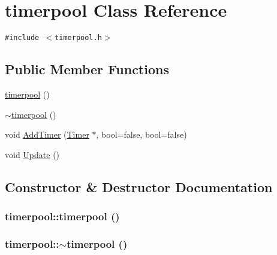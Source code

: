 \hypertarget{classtimerpool}{
\section{timerpool Class Reference}
\label{classtimerpool}
}
{\tt \#include $<$timerpool.h$>$}

\subsection*{Public Member Functions}
\begin{CompactItemize}
\item 
\hyperlink{classtimerpool_d7e24e59b3e1593632c0ce4151f52e1c}{timerpool} ()
\item 
\hyperlink{classtimerpool_de9e292e2815e887f289025956ec3268}{$\sim$timerpool} ()
\item 
void \hyperlink{classtimerpool_c3c343baa7b4c5f8786a542b402b3457}{AddTimer} (\hyperlink{class_timer}{Timer} $\ast$, bool=false, bool=false)
\item 
void \hyperlink{classtimerpool_550b453873442d702dfeb387297d2d82}{Update} ()
\end{CompactItemize}


\subsection{Constructor \& Destructor Documentation}
\hypertarget{classtimerpool_d7e24e59b3e1593632c0ce4151f52e1c}{
\subsubsection[{timerpool}]{\setlength{\rightskip}{0pt plus 5cm}timerpool::timerpool ()}}
\label{classtimerpool_d7e24e59b3e1593632c0ce4151f52e1c}


\hypertarget{classtimerpool_de9e292e2815e887f289025956ec3268}{
\subsubsection[{$\sim$timerpool}]{\setlength{\rightskip}{0pt plus 5cm}timerpool::$\sim$timerpool ()}}
\label{classtimerpool_de9e292e2815e887f289025956ec3268}




